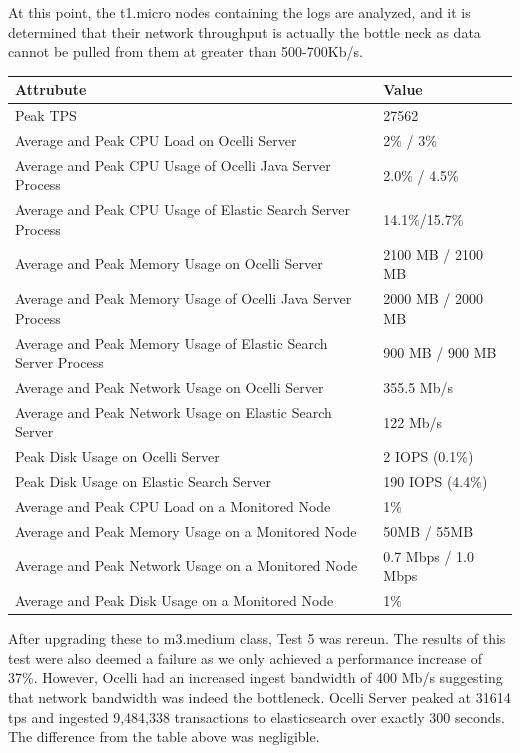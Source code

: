 \documentclass{llncs}
\begin{document}
At this point, the t1.micro nodes containing the logs are analyzed, and it is determined that their network throughput is actually the bottle neck as data cannot be pulled from them at greater than 500-700Kb/s. 

\begin{flushleft}
    \begin{tabular}{ | l | l |}
    \hline
  Attrubute & Value  \\ \hline
  Peak TPS & 27562  \\ \hline
  Average and Peak CPU Load on Ocelli Server &2\% / 3\%  \\ \hline
  Average and Peak CPU Usage of Ocelli Java Server Process & 2.0\% / 4.5\% \\ \hline
 Average and Peak CPU Usage of Elastic Search Server Process & 14.1\%/15.7\%	  \\ \hline
  Average and Peak Memory Usage on Ocelli Server & 2100 MB / 2100 MB	 \\ \hline
  Average and Peak Memory Usage of Ocelli Java Server Process &	2000 MB / 2000 MB		 \\ \hline
 Average and Peak Memory Usage of Elastic Search Server Process &	900 MB / 900 MB		 \\ \hline
Average and Peak Network Usage on Ocelli Server &	355.5 Mb/s 	 \\ \hline
Average and Peak Network Usage on Elastic Search Server & 122 Mb/s 	 \\ \hline
Peak Disk Usage on Ocelli Server &	2 IOPS (0.1\%)		 \\ \hline
Peak Disk Usage on Elastic Search Server &	190 IOPS (4.4\%)		 \\ \hline
Average and Peak CPU Load on a Monitored Node& 	1\% 	 \\ \hline
  Average and Peak Memory Usage on a Monitored Node &	50MB / 55MB	 \\ \hline
Average and Peak Network Usage on a Monitored Node &	0.7 Mbps / 1.0 Mbps		 \\ \hline
  Average and Peak Disk Usage on a Monitored Node &  1\%	\\ 
    \hline
    \end{tabular}
\end{flushleft}

After upgrading these to m3.medium class, Test 5 was rereun. The results of this test were also deemed a failure as we only achieved a performance increase of 37\%. However, Ocelli had an increased ingest bandwidth of 400 Mb/s suggesting that network bandwidth was indeed the bottleneck. Ocelli Server peaked at 31614 tps and ingested 9,484,338 transactions to elasticsearch over exactly 300 seconds. The difference from the table above was negligible.
\end{document}

